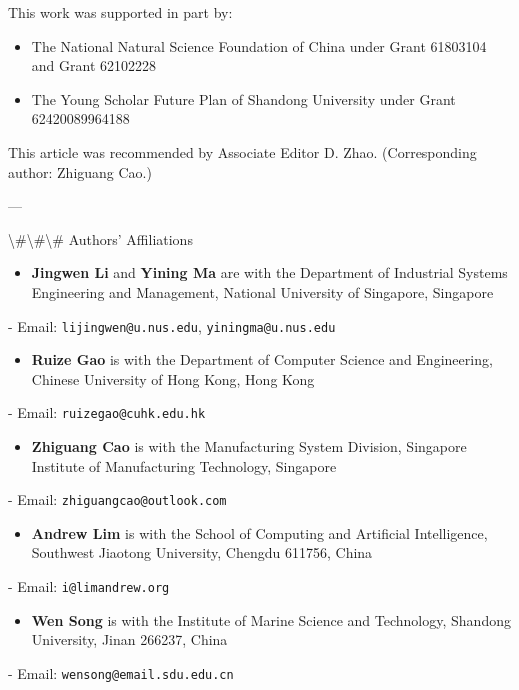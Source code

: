\documentclass{article}
\begin{document}
	This work was supported in part by:
	\begin{itemize}
		\item The National Natural Science Foundation of China under Grant 61803104 and Grant 62102228
		\item The Young Scholar Future Plan of Shandong University under Grant 62420089964188
	\end{itemize}
	
	This article was recommended by Associate Editor D. Zhao. (Corresponding author: Zhiguang Cao.)
	
	---
	
	\textbackslash{}#\textbackslash{}#\textbackslash{}# Authors' Affiliations
	
	\begin{itemize}
		\item \textbf{Jingwen Li} and \textbf{Yining Ma} are with the Department of Industrial Systems Engineering and Management, National University of Singapore, Singapore  
	\end{itemize}
	- Email: \texttt{lijingwen@u.nus.edu}, \texttt{yiningma@u.nus.edu}
	
	\begin{itemize}
		\item \textbf{Ruize Gao} is with the Department of Computer Science and Engineering, Chinese University of Hong Kong, Hong Kong  
	\end{itemize}
	- Email: \texttt{ruizegao@cuhk.edu.hk}
	
	\begin{itemize}
		\item \textbf{Zhiguang Cao} is with the Manufacturing System Division, Singapore Institute of Manufacturing Technology, Singapore  
	\end{itemize}
	- Email: \texttt{zhiguangcao@outlook.com}
	
	\begin{itemize}
		\item \textbf{Andrew Lim} is with the School of Computing and Artificial Intelligence, Southwest Jiaotong University, Chengdu 611756, China  
	\end{itemize}
	- Email: \texttt{i@limandrew.org}
	
	\begin{itemize}
		\item \textbf{Wen Song} is with the Institute of Marine Science and Technology, Shandong University, Jinan 266237, China  
	\end{itemize}
	- Email: \texttt{wensong@email.sdu.edu.cn}
	
\end{document}
